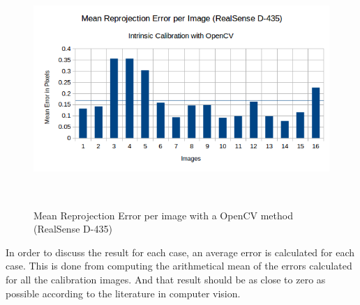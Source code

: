 \begin{figure}[!h]
\begin{center}
\includegraphics[width=5in, height=3.5in]{figures05/opencv_int_cal_real.png}
\caption{Mean Reprojection Error per image with a OpenCV method (RealSense D-435)}%
\label{fig:realopen}
\end{center}
\end{figure}

In order to discuss the result for each case, an average error is calculated for each case. This is done from computing the arithmetical mean of the errors calculated for all the calibration images. And that result should be as close to zero as possible according to the literature in computer vision.

